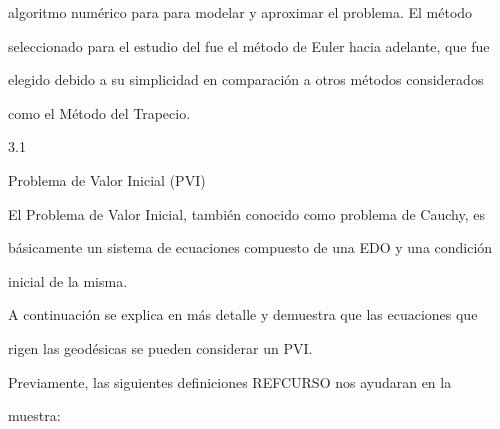 \documentclass[a4paper,portrait,12pt]{article}
\begin{document}
\begin{flushleft}
algoritmo numérico para para modelar y aproximar el problema. El método
\end{flushleft}


\begin{flushleft}
seleccionado para el estudio del fue el método de Euler hacia adelante, que fue
\end{flushleft}


\begin{flushleft}
elegido debido a su simplicidad en comparación a otros métodos considerados
\end{flushleft}


\begin{flushleft}
como el Método del Trapecio.
\end{flushleft}


3.1





\begin{flushleft}
Problema de Valor Inicial (PVI)
\end{flushleft}





\begin{flushleft}
El Problema de Valor Inicial, también conocido como problema de Cauchy, es
\end{flushleft}


\begin{flushleft}
básicamente un sistema de ecuaciones compuesto de una EDO y una condición
\end{flushleft}


\begin{flushleft}
inicial de la misma.
\end{flushleft}


\begin{flushleft}
A continuación se explica en más detalle y demuestra que las ecuaciones que
\end{flushleft}


\begin{flushleft}
rigen las geodésicas se pueden considerar un PVI.
\end{flushleft}


\begin{flushleft}
Previamente, las siguientes definiciones REFCURSO nos ayudaran en la
\end{flushleft}


\begin{flushleft}
muestra:
\end{flushleft}
\end{document}
